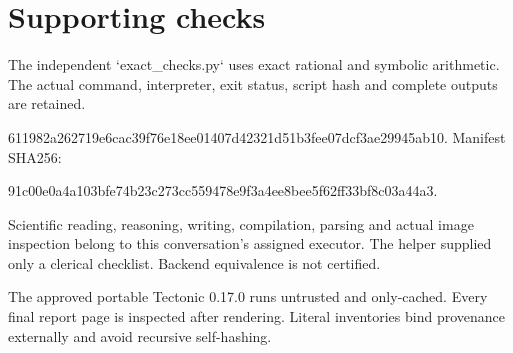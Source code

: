 \documentclass[10pt]{article}
\begin{document}
\section*{Supporting checks}
The independent `exact\_checks.py` uses exact rational and symbolic arithmetic. The actual command, interpreter, exit status, script hash and complete outputs are retained.\par
611982a262719e6cac39f76e18ee01407d42321d51b3fee07dcf3ae29945ab10. Manifest SHA256:\par
91c00e0a4a103bfe74b23c273cc559478e9f3a4ee8bee5f62ff33bf8c03a44a3.\par
Scientific reading, reasoning, writing, compilation, parsing and actual image inspection belong to this conversation’s assigned executor. The helper supplied only a clerical checklist. Backend equivalence is not certified.\par
The approved portable Tectonic 0.17.0 runs untrusted and only-cached. Every final report page is inspected after rendering. Literal inventories bind provenance externally and avoid recursive self-hashing.\par
\end{document}
